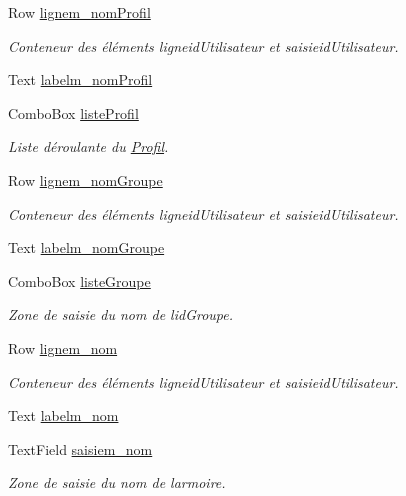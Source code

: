 \begin{DoxyCompactItemize}
Row \hyperlink{class_modification_utilisateur_af5acd7e8d83063454f1c8913d85852b4}{lignem\+\_\+nom\+Profil}
\begin{DoxyCompactList}\small\item\em Conteneur des éléments ligneid\+Utilisateur et saisieid\+Utilisateur. \end{DoxyCompactList}\item 
Text \hyperlink{class_modification_utilisateur_af500dd86463ce0d44236f087ecdcc274}{labelm\+\_\+nom\+Profil}
\item 
Combo\+Box \hyperlink{class_modification_utilisateur_a2ad5d4591030452e872b0ce0b8b7be31}{liste\+Profil}
\begin{DoxyCompactList}\small\item\em Liste déroulante du \hyperlink{class_profil}{Profil}. \end{DoxyCompactList}\item 
Row \hyperlink{class_modification_utilisateur_a3c946ddb52b4f61e2b8877f79474e93e}{lignem\+\_\+nom\+Groupe}
\begin{DoxyCompactList}\small\item\em Conteneur des éléments ligneid\+Utilisateur et saisieid\+Utilisateur. \end{DoxyCompactList}\item 
Text \hyperlink{class_modification_utilisateur_a3ac12ecc01e2fe170eb29be50c5125ae}{labelm\+\_\+nom\+Groupe}
\item 
Combo\+Box \hyperlink{class_modification_utilisateur_a2926585fee5b6a069be98f815ab69b09}{liste\+Groupe}
\begin{DoxyCompactList}\small\item\em Zone de saisie du nom de l\textquotesingle{}id\+Groupe. \end{DoxyCompactList}\item 
Row \hyperlink{class_modification_utilisateur_ae1dd3058ca9b8df258409d7930c54540}{lignem\+\_\+nom}
\begin{DoxyCompactList}\small\item\em Conteneur des éléments ligneid\+Utilisateur et saisieid\+Utilisateur. \end{DoxyCompactList}\item 
Text \hyperlink{class_modification_utilisateur_ab6a20b88034fc847f6ccc14b392447a7}{labelm\+\_\+nom}
\item 
Text\+Field \hyperlink{class_modification_utilisateur_a36552f840e0f6e44a7ee791627c326d1}{saisiem\+\_\+nom}
\begin{DoxyCompactList}\small\item\em Zone de saisie du nom de l\textquotesingle{}armoire. \end{DoxyCompactList}\item 

\end{DoxyCompactItemize}
